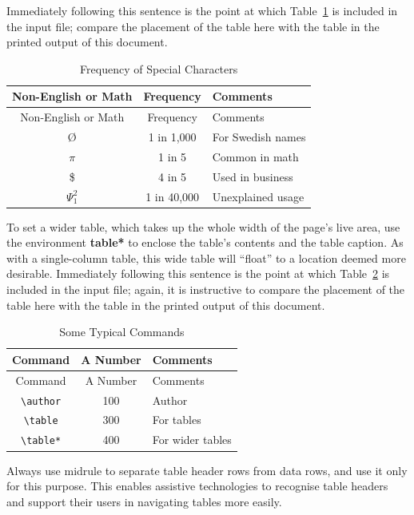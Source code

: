 \documentclass[manuscript,screen]{acmart}
\begin{document}
Immediately following this sentence is the point at which
Table~\ref{tbl-freq} is included in the input file; compare the
placement of the table here with the table in the printed output of this
document.

\hypertarget{tbl-freq}{}
\begin{longtable}[]{@{}ccl@{}}
\caption{\label{tbl-freq}Frequency of Special Characters}\tabularnewline
\toprule()
Non-English or Math & Frequency & Comments \\
\midrule()
\endfirsthead
\toprule()
Non-English or Math & Frequency & Comments \\
\midrule()
\endhead
Ø & 1 in 1,000 & For Swedish names \\
\(\pi\) & 1 in 5 & Common in math \\
\$ & 4 in 5 & Used in business \\
\(\Psi^2_1\) & 1 in 40,000 & Unexplained usage \\
\bottomrule()
\end{longtable}

To set a wider table, which takes up the whole width of the page's live
area, use the environment \textbf{table*} to enclose the table's
contents and the table caption. As with a single-column table, this wide
table will ``float'' to a location deemed more desirable. Immediately
following this sentence is the point at which Table~\ref{tbl-commands}
is included in the input file; again, it is instructive to compare the
placement of the table here with the table in the printed output of this
document.

\hypertarget{tbl-commands}{}
\begin{longtable}[]{@{}ccl@{}}
\caption{\label{tbl-commands}Some Typical Commands}\tabularnewline
\toprule()
Command & A Number & Comments \\
\midrule()
\endfirsthead
\toprule()
Command & A Number & Comments \\
\midrule()
\endhead
\texttt{\textbackslash{}author} & 100 & Author \\
\texttt{\textbackslash{}table} & 300 & For tables \\
\texttt{\textbackslash{}table*} & 400 & For wider tables \\
\bottomrule()
\end{longtable}

Always use midrule to separate table header rows from data rows, and use
it only for this purpose. This enables assistive technologies to
recognise table headers and support their users in navigating tables
more easily.
\end{document}
